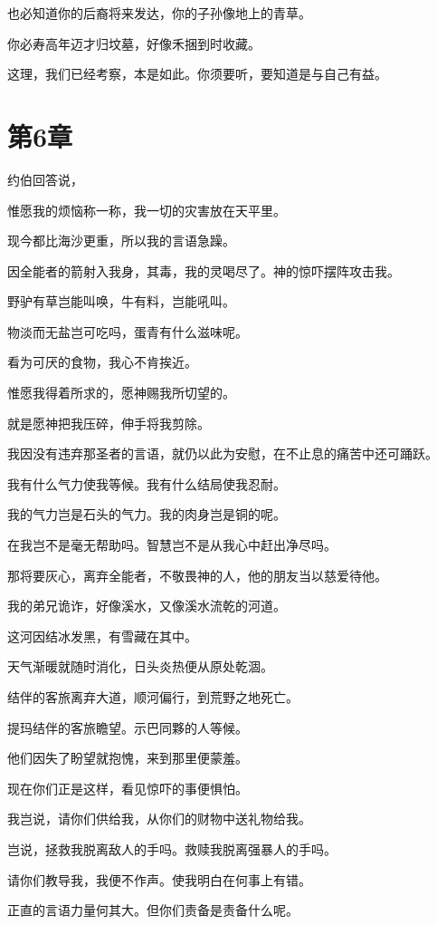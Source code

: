 \documentclass[12pt,oneside]{book}
\begin{document}
也必知道你的后裔将来发达，你的子孙像地上的青草。

你必寿高年迈才归坟墓，好像禾捆到时收藏。

这理，我们已经考察，本是如此。你须要听，要知道是与自己有益。



\chapter{第6章}
约伯回答说，

惟愿我的烦恼称一称，我一切的灾害放在天平里。

现今都比海沙更重，所以我的言语急躁。

因全能者的箭射入我身，其毒，我的灵喝尽了。神的惊吓摆阵攻击我。

野驴有草岂能叫唤，牛有料，岂能吼叫。

物淡而无盐岂可吃吗，蛋青有什么滋味呢。

看为可厌的食物，我心不肯挨近。

惟愿我得着所求的，愿神赐我所切望的。

就是愿神把我压碎，伸手将我剪除。

我因没有违弃那圣者的言语，就仍以此为安慰，在不止息的痛苦中还可踊跃。

我有什么气力使我等候。我有什么结局使我忍耐。

我的气力岂是石头的气力。我的肉身岂是铜的呢。

在我岂不是毫无帮助吗。智慧岂不是从我心中赶出净尽吗。

那将要灰心，离弃全能者，不敬畏神的人，他的朋友当以慈爱待他。

我的弟兄诡诈，好像溪水，又像溪水流乾的河道。

这河因结冰发黑，有雪藏在其中。

天气渐暖就随时消化，日头炎热便从原处乾涸。

结伴的客旅离弃大道，顺河偏行，到荒野之地死亡。

提玛结伴的客旅瞻望。示巴同夥的人等候。

他们因失了盼望就抱愧，来到那里便蒙羞。

现在你们正是这样，看见惊吓的事便惧怕。

我岂说，请你们供给我，从你们的财物中送礼物给我。

岂说，拯救我脱离敌人的手吗。救赎我脱离强暴人的手吗。

请你们教导我，我便不作声。使我明白在何事上有错。

正直的言语力量何其大。但你们责备是责备什么呢。
\end{document}
